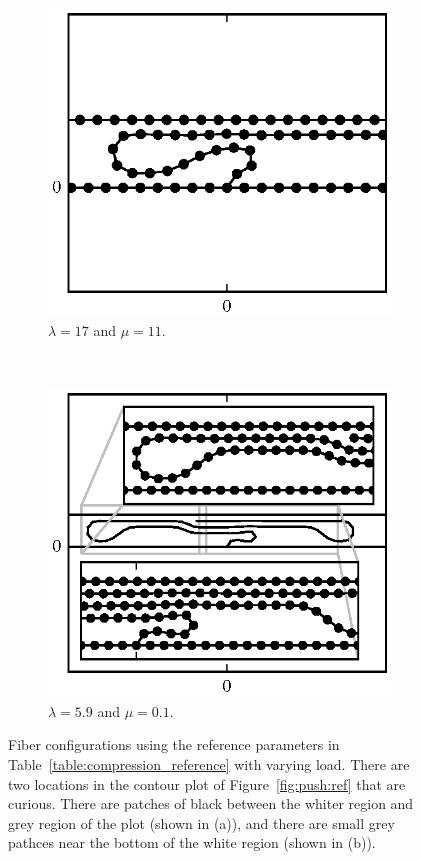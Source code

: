 	\begin{figure}[th!]
		\centering
		\begin{subfigure}{.5\textwidth}
			\centering
			\includegraphics{./fig/ch3/push/ref/l17_m11.eps}
			\caption{$\lambda=17$ and $\mu=11$.\label{subfig:tight_loop}}
		\end{subfigure}%
		~
		\begin{subfigure}{.5\textwidth}
			\centering
			\includegraphics{./fig/ch3/push/ref/l5.9_m0.1.eps}
			\caption{$\lambda=5.9$ and $\mu=0.1$.\label{subfig:tight_hairpin}}
		\end{subfigure}
		\caption{Fiber configurations using the reference parameters in Table~\ref{table:compression_reference} with varying load. There are two locations in the contour plot of Figure~\ref{fig:push:ref} that are curious. There are patches of black between the whiter region and grey region of the plot (shown in (a)), and there are small grey pathces near the bottom of the white region (shown in (b)).\label{fig:ref_special}}
	\end{figure}

